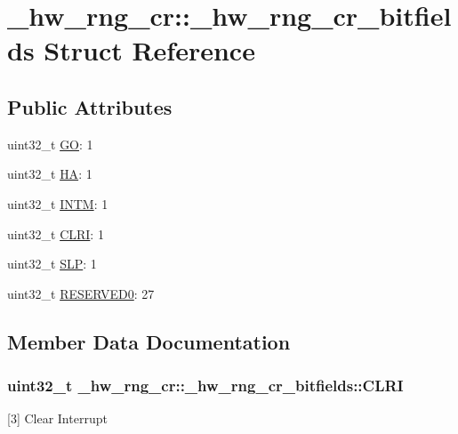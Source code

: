 \hypertarget{struct__hw__rng__cr_1_1__hw__rng__cr__bitfields}{}\section{\+\_\+hw\+\_\+rng\+\_\+cr\+:\+:\+\_\+hw\+\_\+rng\+\_\+cr\+\_\+bitfields Struct Reference}
\label{struct__hw__rng__cr_1_1__hw__rng__cr__bitfields}
\subsection*{Public Attributes}
\begin{DoxyCompactItemize}
\item 
uint32\+\_\+t \hyperlink{struct__hw__rng__cr_1_1__hw__rng__cr__bitfields_a0d8d592b0bd65805738a345066abb858}{GO}\+: 1
\item 
uint32\+\_\+t \hyperlink{struct__hw__rng__cr_1_1__hw__rng__cr__bitfields_a78b0f4317f68604b654ccba525750924}{HA}\+: 1
\item 
uint32\+\_\+t \hyperlink{struct__hw__rng__cr_1_1__hw__rng__cr__bitfields_a765b5c9fdf3fcd37875399136502ac01}{I\+N\+TM}\+: 1
\item 
uint32\+\_\+t \hyperlink{struct__hw__rng__cr_1_1__hw__rng__cr__bitfields_a025fa4a8587a9c7c1d0b404a3e1a7e48}{C\+L\+RI}\+: 1
\item 
uint32\+\_\+t \hyperlink{struct__hw__rng__cr_1_1__hw__rng__cr__bitfields_ae64e5912cea593c3573358bdc7013049}{S\+LP}\+: 1
\item 
uint32\+\_\+t \hyperlink{struct__hw__rng__cr_1_1__hw__rng__cr__bitfields_a1c49317f7967bfe675907c248fd53ef5}{R\+E\+S\+E\+R\+V\+E\+D0}\+: 27
\end{DoxyCompactItemize}


\subsection{Member Data Documentation}
\subsubsection[{\texorpdfstring{C\+L\+RI}{CLRI}}]{\setlength{\rightskip}{0pt plus 5cm}uint32\+\_\+t \+\_\+hw\+\_\+rng\+\_\+cr\+::\+\_\+hw\+\_\+rng\+\_\+cr\+\_\+bitfields\+::\+C\+L\+RI}\hypertarget{struct__hw__rng__cr_1_1__hw__rng__cr__bitfields_a025fa4a8587a9c7c1d0b404a3e1a7e48}{}\label{struct__hw__rng__cr_1_1__hw__rng__cr__bitfields_a025fa4a8587a9c7c1d0b404a3e1a7e48}
\mbox{[}3\mbox{]} Clear Interrupt 
